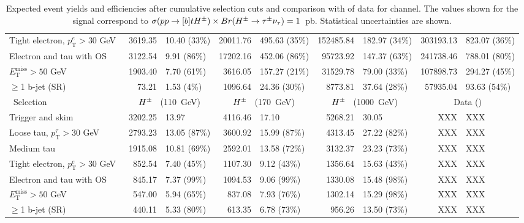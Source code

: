 \begin{table}[!thp]
\begin{center}
{\begin{tabular}{|l|r@{ $\pm$ }l|r@{ $\pm$ }l|r@{ $\pm$ }l|r@{ $\pm$ }l|}
			Tight electron, $p_\mathrm{T}^{e}>30$ GeV           & 3619.35 & 10.40 (33\%) & 20011.76 & 495.63 (35\%) & 152485.84 & 182.97 (34\%) & 303193.13 & 823.07 (36\%) \\
			Electron and tau with OS                         & 3122.54 & 9.91 (86\%) & 17202.16 & 452.06 (86\%) & 95723.92 & 147.37 (63\%) & 241738.46 & 788.01 (80\%) \\
			$E_\mathrm{T}^\mathrm{miss}>50$ GeV\       & 1903.40 & 7.70 (61\%) & 3616.05 & 157.27 (21\%) & 31529.78 & 79.00 (33\%) & 107898.73 & 294.27 (45\%) \\
			$\ge$1 b-jet (SR)                          & 73.21 & 1.53 (4\%) &  1096.64 & 24.36 (30\%) & 8773.81 & 37.64 (28\%) & 57935.04 & 93.63 (54\%) \\
			\hline\
			Selection                                        & \multicolumn{2}{c|}{$H^{\pm}$ $\phantom{0}$(110~GeV)} & \multicolumn{2}{c|}{$H^{\pm}$ $\phantom{0}$(170~GeV)} & \multicolumn{2}{c|}{$H^{\pm}$ $\phantom{0}$(1000~GeV)} & \multicolumn{2}{c|}{Data (\LUMI )}  \\ 
			\hline
			Trigger and skim                            & 3202.25 & 13.97 & 4116.46 & 17.10 & 5268.21 & 30.05 & XXX & XXX \\
			Loose tau, $p_\mathrm{T}^{\tau}>30$ GeV & 2793.23 & 13.05 (87\%) & 3600.92 & 15.99 (87\%) & 4313.45 & 27.22 (82\%) & XXX & XXX \\
			Medium tau   & 1915.08 & 10.81 (69\%) & 2592.01 & 13.58 (72\%) & 3132.37 & 23.23 (73\%) & XXX & XXX \\
			Tight electron, $p_\mathrm{T}^{e}>30$ GeV\  & 852.54 & 7.40 (45\%) & 1107.30 & 9.12 (43\%) & 1356.64 & 15.63 (43\%) & XXX & XXX \\
			Electron and tau with OS                    & 845.17 & 7.37 (99\%) & 1094.53 & 9.06 (99\%) & 1330.08 & 15.48 (98\%) & XXX & XXX  \\
			$E_\mathrm{T}^\mathrm{miss}>50$ GeV\          & 547.00 & 5.94 (65\%) & 837.08 & 7.93 (76\%) & 1302.14 & 15.29 (98\%) & XXX & XXX \\
			$\ge$1 b-jet (SR)                            & 440.11 & 5.33 (80\%) & 613.35 & 6.78 (73\%) & 956.26 & 13.50 (73\%) & XXX & XXX \\
			\hline
			\end{tabular}}
			\caption{\label{tab:expected_yields_taue}
			  Expected event yields and efficiencies after cumulative selection cuts and comparison with \LUMI of
			 data for \tauel channel. 
			 The values shown for the signal correspond to $\sigma(pp \to [b]tH^{\pm}) \times Br(H^{\pm} \to \tau^{\pm} \nu_{\tau})=1$~pb.
			 Statistical uncertainties are shown.}
			\end{center}
		\end{table}

